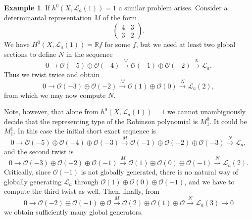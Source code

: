 \documentclass[a4paper,10pt]{amsart}
\theoremstyle{definition}
\newtheorem{ex}[Def]{Example}
\theoremstyle{plain}
\newcommand{\cL}{{\mathcal L}}
\newcommand{\cO}{{\mathcal O}}
\newcommand{\R}{{\mathbb R}}
\begin{document}
\begin{ex}
If $h^0(X, \cL_a(1)) = 1$ a similar problem arises. Consider a determinantal representation $M$ of the form
\begin{equation*}
    \begin{pmatrix}
        4 & 3 \\
        3 & 2
    \end{pmatrix}.
\end{equation*}
We have $H^0(X, \cL_a(1)) = \R f$ for some $f$, but we need at least two global sections to define $N$ in the sequence
\begin{equation*}
    0 \to \cO(-5) \oplus \cO(-4) \overset{M}{\to} \cO(-1) \oplus \cO(-2) \overset{N}{\to} \cL_a.
\end{equation*}
Thus we twist twice and obtain
\begin{equation*}
    0 \to \cO(-3) \oplus \cO(-2) \overset{M}{\to} \cO(1) \oplus \cO(0) \overset{N}{\to} \cL_a(2),
\end{equation*}
from which we may now compute $N$.

Note, however, that alone from $h^0(X, \cL_a(1)) = 1$ we cannot unambiguously decide that the representing type of the Robinson polynomial is $M_1^0$. It could be $M_1^1$. In this case the initial short exact sequence is
\begin{equation*}
    0 \to \cO(-5) \oplus \cO(-4) \oplus \cO(-3) \overset{M}{\to} \cO(-1) \oplus \cO(-2) \oplus \cO(-3) \overset{N}{\to} \cL_a,
\end{equation*}
and the second twist is
\begin{equation*}
    0 \to \cO(-3) \oplus \cO(-2) \oplus \cO(-1) \overset{M}{\to} \cO(1) \oplus \cO(0) \oplus \cO(-1) \overset{N}{\to} \cL_a(2).
\end{equation*}
Critically, since $\cO(-1)$ is not globally generated, there is no natural way of globally generating $\cL_a$ through $\cO(1) \oplus \cO(0) \oplus \cO(-1)$, and we have to compute the third twist as well. Then, finally, from
\begin{equation*}
    0 \to \cO(-2) \oplus \cO(-1) \oplus \cO \overset{M}{\to} \cO(2) \oplus \cO(1) \oplus \cO \overset{N}{\to} \cL_a(3) \to 0
\end{equation*}
we obtain sufficiently many global generators.
\end{ex}
\end{document}
